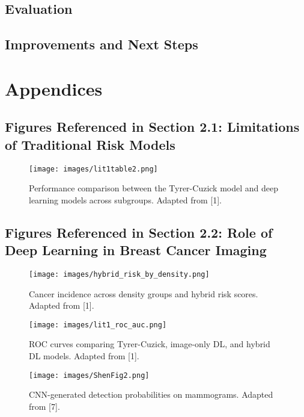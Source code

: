 \documentclass[12pt]{article}
\begin{document}
\subsection{Evaluation}
\subsection{Improvements and Next Steps}

\newpage
\section{Appendices}

\subsection{Figures Referenced in Section 2.1: Limitations of Traditional Risk Models}

\begin{figure}[H]
    \centering
    \texttt{[image: images/lit1table2.png]}
    \caption{Performance comparison between the Tyrer-Cuzick model and deep learning models across subgroups. Adapted from [1].}
    \label{fig:lit1table2}
\end{figure}

\subsection{Figures Referenced in Section 2.2: Role of Deep Learning in Breast Cancer Imaging}

\begin{figure}[H]
    \centering
    \texttt{[image: images/hybrid\_risk\_by\_density.png]}
    \caption{Cancer incidence across density groups and hybrid risk scores. Adapted from [1].}
    \label{fig:hybrid_density}
\end{figure}

\begin{figure}[H]
    \centering
    \texttt{[image: images/lit1\_roc\_auc.png]}
    \caption{ROC curves comparing Tyrer-Cuzick, image-only DL, and hybrid DL models. Adapted from [1].}
    \label{fig:lit1roc}
\end{figure}

\begin{figure}[H]
    \centering
    \texttt{[image: images/ShenFig2.png]}
    \caption{CNN-generated detection probabilities on mammograms. Adapted from [7].}
    \label{fig:shen2019}
\end{figure}
\end{document}
